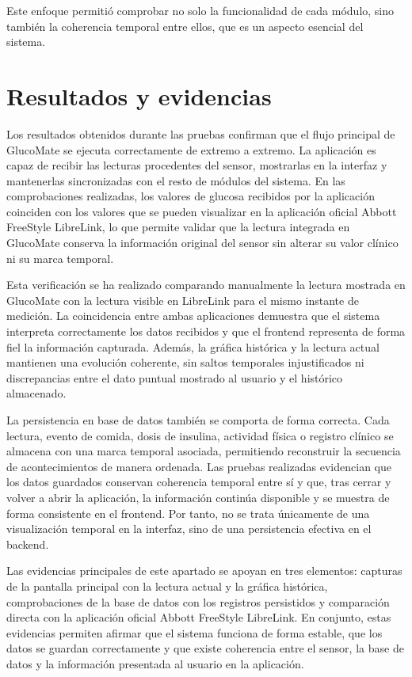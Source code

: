 Este enfoque permitió comprobar no solo la funcionalidad de cada módulo, sino también la
coherencia temporal entre ellos, que es un aspecto esencial del sistema.

\section{Resultados y evidencias}

Los resultados obtenidos durante las pruebas confirman que el flujo principal de
GlucoMate se ejecuta correctamente de extremo a extremo. La aplicación es capaz de recibir
las lecturas procedentes del sensor, mostrarlas en la interfaz y mantenerlas sincronizadas
con el resto de módulos del sistema. En las comprobaciones realizadas, los valores de
glucosa recibidos por la aplicación coinciden con los valores que se pueden visualizar en
la aplicación oficial Abbott FreeStyle LibreLink, lo que permite validar que la lectura
integrada en GlucoMate conserva la información original del sensor sin alterar su valor
clínico ni su marca temporal.

Esta verificación se ha realizado comparando manualmente la lectura mostrada en GlucoMate
con la lectura visible en LibreLink para el mismo instante de medición. La coincidencia
entre ambas aplicaciones demuestra que el sistema interpreta correctamente los datos
recibidos y que el frontend representa de forma fiel la información capturada. Además, la
gráfica histórica y la lectura actual mantienen una evolución coherente, sin saltos
temporales injustificados ni discrepancias entre el dato puntual mostrado al usuario y el
histórico almacenado.

La persistencia en base de datos también se comporta de forma correcta. Cada lectura,
evento de comida, dosis de insulina, actividad física o registro clínico se almacena con
una marca temporal asociada, permitiendo reconstruir la secuencia de acontecimientos de
manera ordenada. Las pruebas realizadas evidencian que los datos guardados conservan
coherencia temporal entre sí y que, tras cerrar y volver a abrir la aplicación, la
información continúa disponible y se muestra de forma consistente en el frontend. Por
tanto, no se trata únicamente de una visualización temporal en la interfaz, sino de una
persistencia efectiva en el backend.

Las evidencias principales de este apartado se apoyan en tres elementos: capturas de la
pantalla principal con la lectura actual y la gráfica histórica, comprobaciones de la base
de datos con los registros persistidos y comparación directa con la aplicación oficial
Abbott FreeStyle LibreLink. En conjunto, estas evidencias permiten afirmar que el sistema
funciona de forma estable, que los datos se guardan correctamente y que existe coherencia
entre el sensor, la base de datos y la información presentada al usuario en la aplicación.

